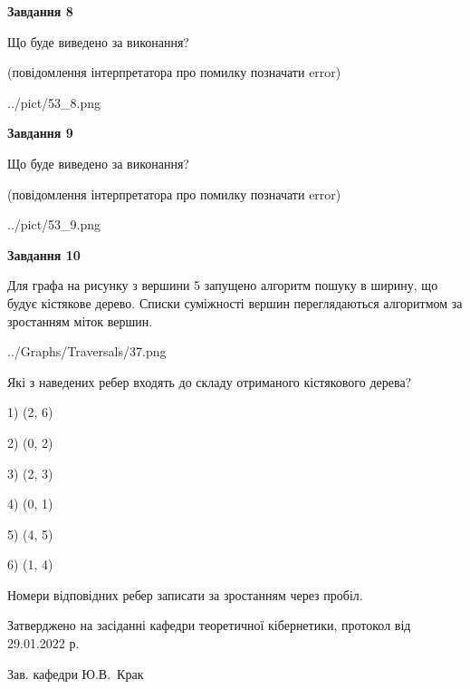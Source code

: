 \documentclass[12pt, ukrainian]{article}
\begin{document}
{\begin {large}
{\begin {center}\textbf{Завдання 8}\end {center}}\par
Що буде виведено за виконання?\par
 (повідомлення інтерпретатора про помилку позначати error)
\begin{center}
	{../pict/53_8.png}
\end{center}
\newpage

{\begin {center}\textbf{Завдання 9}\end {center}}\par
Що буде виведено за виконання?\par
 (повідомлення інтерпретатора про помилку позначати error)\par
\begin{center}
	{../pict/53_9.png}
\end{center}
\newpage

{\begin {center}\textbf{Завдання 10}\end {center}}\par
Для графа на рисунку з вершини 5 запущено алгоритм пошуку в ширину, що будує кістякове дерево. Списки суміжності вершин переглядаються алгоритмом за зростанням міток вершин.\par
\begin{center}
	{../Graphs/Traversals/37.png}
\end{center}
\par Які з наведених ребер входять до складу отриманого кістякового дерева?\par
1) (2, 6)\par
2) (0, 2)\par
3) (2, 3)\par
4) (0, 1)\par
5) (4, 5)\par
6) (1, 4)\par
{\vskip 15pt} Номери відповідних ребер записати за зростанням через пробіл.\par
\newpage


\end {large}
}
{\smallskip \begin {small} Затверджено на засіданні кафедри теоретичної кібернетики, протокол  від   29.01.2022 р.\par\smallskip\smallskip
{\parbox {6.5 cm}{Зав. кафедри \dotfill Ю.В.~Крак}} \end{small}}
\end{document}
